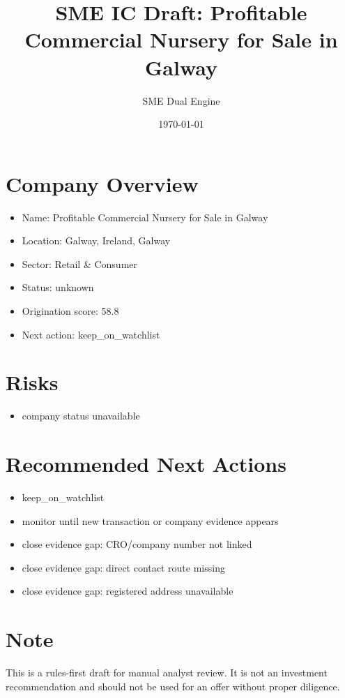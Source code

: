 \documentclass[11pt,a4paper]{article}
\title{SME IC Draft: Profitable Commercial Nursery for Sale in Galway}
\author{SME Dual Engine}
\date{\today}
\begin{document}
\maketitle
\section*{Company Overview}
\begin{itemize}[leftmargin=1.4em]
\item Name: Profitable Commercial Nursery for Sale in Galway
\item Location: Galway, Ireland, Galway
\item Sector: Retail \& Consumer
\item Status: unknown
\item Origination score: 58.8
\item Next action: keep\_on\_watchlist
\end{itemize}
\section*{Risks}
\begin{itemize}[leftmargin=1.4em]
\item company status unavailable
\end{itemize}
\section*{Recommended Next Actions}
\begin{itemize}[leftmargin=1.4em]
\item keep\_on\_watchlist
\item monitor until new transaction or company evidence appears
\item close evidence gap: CRO/company number not linked
\item close evidence gap: direct contact route missing
\item close evidence gap: registered address unavailable
\end{itemize}
\section*{Note}
This is a rules-first draft for manual analyst review. It is not an investment
recommendation and should not be used for an offer without proper diligence.
\end{document}
